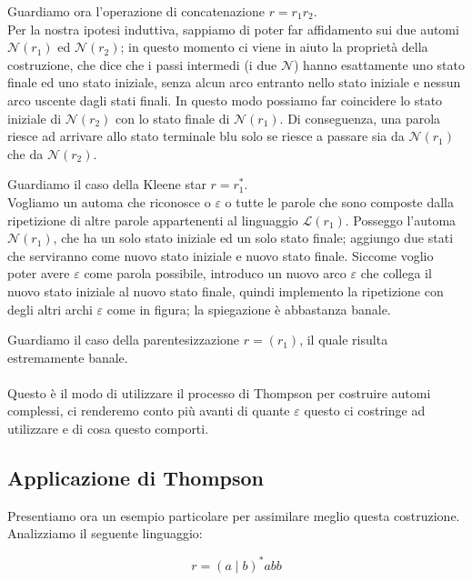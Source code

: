 \documentclass[class=book, crop=false, oneside, 12pt]{standalone}
\begin{document}
Guardiamo ora l’operazione di concatenazione \(r = r_1 r_2\).\\
Per la nostra ipotesi induttiva, sappiamo di poter far affidamento sui due automi \(\mathcal{N}(r_1)\) ed \(\mathcal{N}(r_2)\); in questo momento ci viene in aiuto la proprietà della costruzione, che dice che i passi intermedi (i due \(\mathcal{N}\)) hanno esattamente uno stato finale ed uno stato iniziale, senza alcun arco entranto nello stato iniziale e nessun arco uscente dagli stati finali. 
In questo modo possiamo far coincidere lo stato iniziale di \(\mathcal{N}(r_2)\) con lo stato finale di \(\mathcal{N}(r_1)\). 
Di conseguenza, una parola riesce ad arrivare allo stato terminale blu solo se riesce a passare sia da \(\mathcal{N}(r_1)\) che da \(\mathcal{N}(r_2)\).

Guardiamo il caso della Kleene star \(r = r_1^*\).\\
Vogliamo un automa che riconosce o \(\varepsilon\) o tutte le parole che sono composte dalla ripetizione di altre parole appartenenti al linguaggio \(\mathcal{L}(r_1)\).
Posseggo l’automa \(\mathcal{N}(r_1)\), che ha un solo stato iniziale ed un solo stato finale; aggiungo due stati che serviranno come nuovo stato iniziale e nuovo stato finale.
Siccome voglio poter avere \(\varepsilon\) come parola possibile, introduco un nuovo arco \(\varepsilon\) che collega il nuovo stato iniziale al nuovo stato finale, quindi implemento la ripetizione con degli altri archi \(\varepsilon\) come in figura; la spiegazione è abbastanza banale.

Guardiamo il caso della parentesizzazione \(r = ( r_1 )\), il quale risulta estremamente banale.\\
\\
Questo è il modo di utilizzare il processo di Thompson per costruire automi complessi, ci renderemo conto più avanti di quante \(\varepsilon\) questo ci costringe ad utilizzare e di cosa questo comporti.

\subsection{Applicazione di Thompson}
Presentiamo ora un esempio particolare per assimilare meglio questa costruzione. Analizziamo il seguente linguaggio:

\begin{equation}
    r = (a \mid b)^\ast abb
\end{equation}
\end{document}
